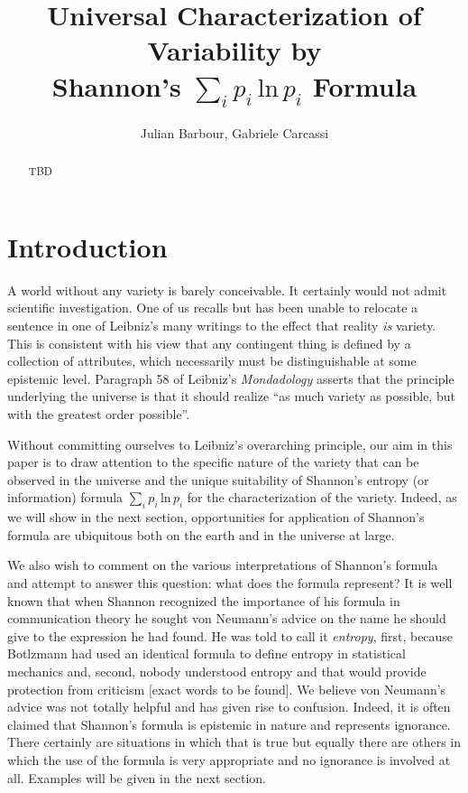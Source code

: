 \documentclass{article}
\title{Universal Characterization of Variability by \\Shannon's $\sum_ip_i\,\textrm{ln}\,p_i$ Formula}
\author{
	Julian Barbour, 
	Gabriele Carcassi
}
\begin{document}
\maketitle

\tableofcontents

\begin{abstract}
TBD
\end{abstract}




\section{Introduction\label{int}}

A world without any variety is barely conceivable. It certainly would not admit scientific investigation. One of us recalls but has been unable to relocate a sentence in one of Leibniz's many writings to the effect that reality \emph{is} variety. This is consistent with his view that any contingent thing is defined by a collection of attributes, which necessarily must be distinguishable
at some epistemic level. Paragraph 58 of Leibniz's \emph{Mondadology} asserts that the principle underlying the universe is that it should realize ``as much variety as possible, but with the greatest order possible''.

Without committing ourselves to Leibniz's overarching principle, our aim in this paper is to draw attention to the specific nature of the variety that can be observed in the universe and the unique suitability of Shannon's entropy (or information) formula $\sum_ip_i\,\textrm{ln}\,p_i$ for the characterization of the variety. Indeed, as we will show in the next section, opportunities for application of Shannon's formula are ubiquitous both on the earth and in the universe at large.

We also wish to comment on the various interpretations of Shannon's formula and attempt to answer this question: what does the formula represent? It is well known that when Shannon recognized the importance of his formula in communication theory he sought von Neumann's advice on the name he should give to the expression he had found. He was told to call it \emph{entropy}, first, because Botlzmann had used an identical formula to define entropy in statistical mechanics and, second, nobody understood entropy and that would provide protection from criticism [exact words to be found]. We believe von Neumann's advice was not totally helpful and has given rise to confusion. Indeed, it is often claimed that Shannon's formula is epistemic in nature and represents ignorance. There certainly are situations in which that is true but equally there are others in which the use of the formula is very appropriate and no ignorance is involved at all. Examples will be given in the next section.
\end{document}

